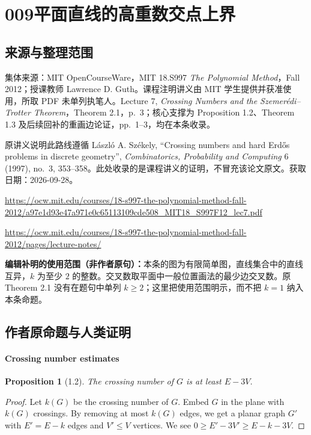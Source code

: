 \documentclass[UTF8,11pt]{ctexart}
\newtheorem*{proposition}{Proposition}
\begin{document}
\section*{009\quad 平面直线的高重数交点上界}
\subsection*{来源与整理范围}
集体来源：MIT OpenCourseWare，MIT 18.S997 \emph{The Polynomial Method}，Fall 2012；授课教师 Lawrence D. Guth。课程注明讲义由 MIT 学生提供并获准使用，所取 PDF 未单列执笔人。Lecture 7, \emph{Crossing Numbers and the Szemer\'edi--Trotter Theorem}，Theorem 2.1，p.~3；核心支撑为 Proposition 1.2、Theorem 1.3 及后续回补的重画边论证，pp.~1--3，均在本条收录。

原讲义说明此路线遵循 L\'aszl\'o A. Sz\'ekely, ``Crossing numbers and hard Erd\H{o}s problems in discrete geometry'', \emph{Combinatorics, Probability and Computing} 6 (1997), no.~3, 353--358。此处收录的是课程讲义的证明，不冒充该论文原文。获取日期：2026-09-28。
\par\url{https://ocw.mit.edu/courses/18-s997-the-polynomial-method-fall-2012/a97e1d93e47a971e0c65113109cde508_MIT18_S997F12_lec7.pdf}
\par\url{https://ocw.mit.edu/courses/18-s997-the-polynomial-method-fall-2012/pages/lecture-notes/}

\textbf{编辑补明的使用范围（非作者原句）：}本条的图为有限简单图，直线集合中的直线互异，$k$ 为至少 $2$ 的整数。交叉数取平面中一般位置画法的最少边交叉数。原 Theorem 2.1 没有在题句中单列 $k\geq2$；这里把使用范围明示，而不把 $k=1$ 纳入本条命题。

\subsection*{作者原命题与人类证明}
\paragraph{Crossing number estimates}
\begin{proposition}[1.2]
The crossing number of $G$ is at least $E-3V$.
\end{proposition}
\begin{proof}
Let $k(G)$ be the crossing number of $G$. Embed $G$ in the plane with $k(G)$ crossings. By removing at most $k(G)$ edges, we get a planar graph $G'$ with $E'=E-k$ edges and $V'\leq V$ vertices. We see $0\geq E'-3V'\geq E-k-3V$.
\end{proof}
\end{document}
